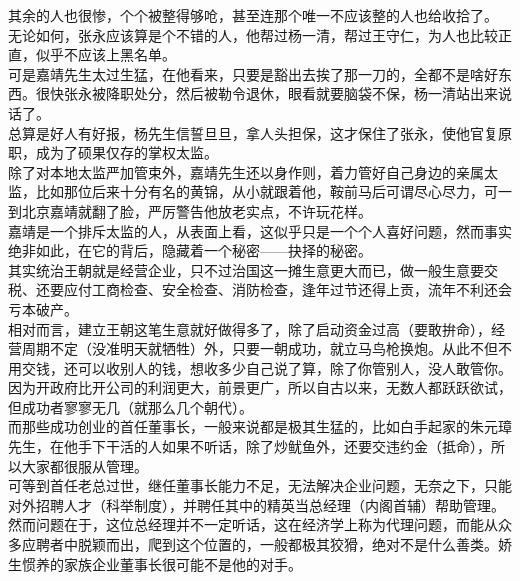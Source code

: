 \begin{multicols}{\theparacolNo}
其余的人也很惨，个个被整得够呛，甚至连那个唯一不应该整的人也给收拾了。\\

无论如何，张永应该算是个不错的人，他帮过杨一清，帮过王守仁，为人也比较正直，似乎不应该上黑名单。\\

可是嘉靖先生太过生猛，在他看来，只要是豁出去挨了那一刀的，全都不是啥好东西。很快张永被降职处分，然后被勒令退休，眼看就要脑袋不保，杨一清站出来说话了。\\

总算是好人有好报，杨先生信誓旦旦，拿人头担保，这才保住了张永，使他官复原职，成为了硕果仅存的掌权太监。\\

除了对本地太监严加管束外，嘉靖先生还以身作则，着力管好自己身边的亲属太监，比如那位后来十分有名的黄锦，从小就跟着他，鞍前马后可谓尽心尽力，可一到北京嘉靖就翻了脸，严厉警告他放老实点，不许玩花样。\\

嘉靖是一个排斥太监的人，从表面上看，这似乎只是一个个人喜好问题，然而事实绝非如此，在它的背后，隐藏着一个秘密——抉择的秘密。\\

其实统治王朝就是经营企业，只不过治国这一摊生意更大而已，做一般生意要交税、还要应付工商检查、安全检查、消防检查，逢年过节还得上贡，流年不利还会亏本破产。\\

相对而言，建立王朝这笔生意就好做得多了，除了启动资金过高（要敢拚命），经营周期不定（没准明天就牺牲）外，只要一朝成功，就立马鸟枪换炮。从此不但不用交钱，还可以收别人的钱，想收多少自己说了算，除了你管别人，没人敢管你。\\

因为开政府比开公司的利润更大，前景更广，所以自古以来，无数人都跃跃欲试，但成功者寥寥无几（就那么几个朝代）。\\

而那些成功创业的首任董事长，一般来说都是极其生猛的，比如白手起家的朱元璋先生，在他手下干活的人如果不听话，除了炒鱿鱼外，还要交违约金（抵命），所以大家都很服从管理。\\

可等到首任老总过世，继任董事长能力不足，无法解决企业问题，无奈之下，只能对外招聘人才（科举制度），并聘任其中的精英当总经理（内阁首辅）帮助管理。\\

然而问题在于，这位总经理并不一定听话，这在经济学上称为代理问题，而能从众多应聘者中脱颖而出，爬到这个位置的，一般都极其狡猾，绝对不是什么善类。娇生惯养的家族企业董事长很可能不是他的对手。\\


\end{multicols}
